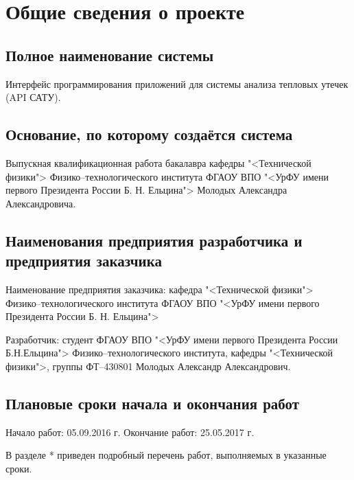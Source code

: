 \chapter{Общие сведения о проекте}

\section{Полное наименование системы}

\par
	Интерфейс программирования приложений для системы анализа тепловых утечек (API САТУ).

\section{Основание, по которому создаётся система}

\par
	Выпускная квалификационная работа бакалавра кафедры "<Технической физики"> Физико–технологи­ческого института ФГАОУ ВПО "<УрФУ имени первого Президента России Б. Н. Ельцина"> Молодых Александра Александровича.

\section{Наименования предприятия разработчика и предприятия заказчика}

\par
	Наименование предприятия заказчика: кафедра "<Технической физики"> Физико–технологи­ческого института ФГАОУ ВПО "<УрФУ имени первого Президента России Б. Н. Ельцина">

	Разработчик: студент ФГАОУ ВПО "<УрФУ имени первого Президента России Б.Н.Ельцина"> Физико–технологического института, кафедры "<Технической физики">, группы ФТ–430801 Молодых Александр Александрович.

\section{Плановые сроки начала и окончания работ}
	Начало работ: 05.09.2016 г.
	Окончание работ: 25.05.2017 г.
 
	В разделе * приведен подробный перечень работ, выполняемых в указанные сроки.
